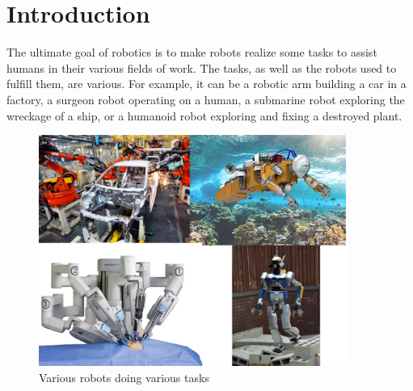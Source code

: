 


\chapter*{Introduction}
\label{cha:introduction}

\graphicspath{{Chapter0-Introduction/Figs/Vector/}{Chapter0-Introduction/Figs/}}

The ultimate goal of robotics is to make robots realize some tasks to assist humans in their various fields of work.
The tasks, as well as the robots used to fulfill them, are various.
For example, it can be a robotic arm building a car in a factory, a surgeon robot operating on a human, a submarine robot exploring the wreckage of a ship, or a humanoid robot exploring and fixing a destroyed plant.

\begin{figure}[ht]
  \centering
  \includegraphics[width=0.9\textwidth]{various-tasks.png}
  \caption{Various robots doing various tasks}
\label{fig:various}
\end{figure}

